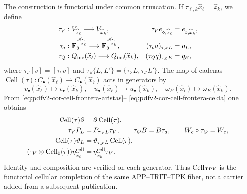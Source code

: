 The construction is functorial under common truncation. If
\(\tau_{\ell,k}\widehat x_\ell=\widehat x_k\), we define
\begin{align*}
 \tau_V&:V_{\widehat x_\ell}\longrightarrow V_{\widehat x_k},&
 \tau_Ve_{\diamond,\widehat x_\ell}&=e_{\diamond,\widehat x_k},\\
 \tau_a&:\mathbf F_3^{\mathscr I_{\widehat x_\ell}}
          \longrightarrow\mathbf F_3^{\mathscr I_{\widehat x_k}},&
 (\tau_aa)_{\tau_{\mathscr I}L}&=a_L,\\
 \tau_Q&:Q_{\rm inc}(\widehat x_\ell)
          \longrightarrow Q_{\rm inc}(\widehat x_k),&
 (\tau_Qq)_{\tau_{\mathscr E}E}&=q_E,
\end{align*}
where \(\tau_{\mathscr I}[v]=[\tau_Vv]\) and
\(\tau_{\mathscr E}\{L,L'\}=\{\tau_{\mathscr I}L,
\tau_{\mathscr I}L'\}\). The map of cadenas
\(\operatorname{Cell}(\tau):C_\bullet(\widehat x_\ell)
\to C_\bullet(\widehat x_k)\) acts in generators by
\begin{equation}
\label{eq:pdfv2-cor-cell-truncamiento-generadores}
 v_\bullet(\widehat x_\ell)\mapsto v_\bullet(\widehat x_k),\quad
 u_\bullet(\widehat x_\ell)\mapsto u_\bullet(\widehat x_k),\quad
 \omega_E(\widehat x_\ell)\mapsto\omega_E(\widehat x_k).
\end{equation}
From \eqref{eq:pdfv2-cor-cell-frontera-aristas}--
\eqref{eq:pdfv2-cor-cell-frontera-celda} one obtains
\begin{equation}
\label{eq:pdfv2-cor-collar-naturalidad}
\begin{aligned}
 \operatorname{Cell}(\tau)\partial
 &=\partial\operatorname{Cell}(\tau),\\
 \tau_VP_L&=P_{\tau_{\mathscr I}L}\tau_V,\qquad
 \tau_QB=B\tau_a,\qquad W_c\circ\tau_Q=W_c,\\
 \operatorname{Cell}(\tau)\vartheta_L
 &=\vartheta_{\tau_{\mathscr I}L}\operatorname{Cell}(\tau),\\
 (\tau_V\otimes\operatorname{Cell}_0(\tau))
 \eta^{\rm cell}_{\widehat x_\ell}
 &=\eta^{\rm cell}_{\widehat x_k}\tau_V.
\end{aligned}
\end{equation}
Identity and composition are verified on each generator. Thus
\(\operatorname{Cell}_{\rm TPK}\) is the functorial cellular completion of
the same APP--TRIT--TPK fiber, not a carrier added from a subsequent
publication.

